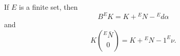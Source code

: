 If $E$ is a finite set, then
$$B^E K = K + {}^E N - {}^E d\alpha$$
and
$$K \binom{{}^E \bar{N}}{0} = K + {}^E N - 1^E \nu.$$
